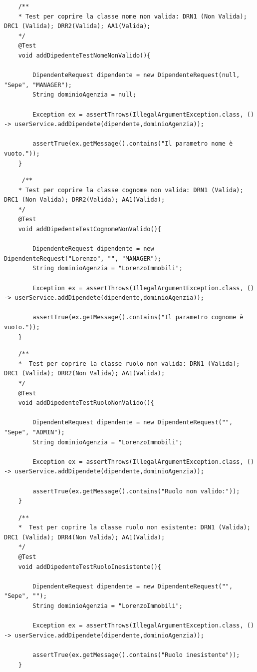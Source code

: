 \begin{lstlisting}
	/**
	* Test per coprire la classe nome non valida: DRN1 (Non Valida); DRC1 (Valida); DRR2(Valida); AA1(Valida);
	*/
	@Test
	void addDipedenteTestNomeNonValido(){
		
		DipendenteRequest dipendente = new DipendenteRequest(null, "Sepe", "MANAGER");
		String dominioAgenzia = null;
		
		Exception ex = assertThrows(IllegalArgumentException.class, () -> userService.addDipendete(dipendente,dominioAgenzia));
		
		assertTrue(ex.getMessage().contains("Il parametro nome è vuoto."));
	}
\end{lstlisting}

\begin{lstlisting}
	 /**
	* Test per coprire la classe cognome non valida: DRN1 (Valida); DRC1 (Non Valida); DRR2(Valida); AA1(Valida);
	*/
	@Test
	void addDipedenteTestCognomeNonValido(){
		
		DipendenteRequest dipendente = new DipendenteRequest("Lorenzo", "", "MANAGER");
		String dominioAgenzia = "LorenzoImmobili";
		
		Exception ex = assertThrows(IllegalArgumentException.class, () -> userService.addDipendete(dipendente,dominioAgenzia));
		
		assertTrue(ex.getMessage().contains("Il parametro cognome è vuoto."));
	}
\end{lstlisting}

\begin{lstlisting}
	/**
	*  Test per coprire la classe ruolo non valida: DRN1 (Valida); DRC1 (Valida); DRR2(Non Valida); AA1(Valida);
	*/
	@Test
	void addDipedenteTestRuoloNonValido(){
		
		DipendenteRequest dipendente = new DipendenteRequest("", "Sepe", "ADMIN");
		String dominioAgenzia = "LorenzoImmobili";
		
		Exception ex = assertThrows(IllegalArgumentException.class, () -> userService.addDipendete(dipendente,dominioAgenzia));
		
		assertTrue(ex.getMessage().contains("Ruolo non valido:"));
	}
\end{lstlisting}

\begin{lstlisting}
	/**
	*  Test per coprire la classe ruolo non esistente: DRN1 (Valida); DRC1 (Valida); DRR4(Non Valida); AA1(Valida);
	*/
	@Test
	void addDipedenteTestRuoloInesistente(){
		
		DipendenteRequest dipendente = new DipendenteRequest("", "Sepe", "");
		String dominioAgenzia = "LorenzoImmobili";
		
		Exception ex = assertThrows(IllegalArgumentException.class, () -> userService.addDipendete(dipendente,dominioAgenzia));
		
		assertTrue(ex.getMessage().contains("Ruolo inesistente"));
	}
\end{lstlisting}

